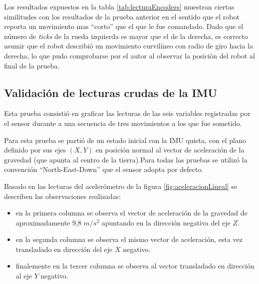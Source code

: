 Los resultados expuestos en la tabla \ref{tab:lecturaEncoders} muestran ciertas similitudes con los resultados de la prueba anterior en el sentido que el robot reporta un movimiento mas ``corto'' que el que le fue comandado. Dado que el número de \textit{ticks} de la rueda izquierda es mayor que el de la derecha, es correcto asumir que el robot describió un movimiento curvilíneo con radio de giro hacia la derecha, lo que pudo comprobarse por el autor al observar la posición del robot al final de la prueba.

\subsection{Validación de lecturas crudas de la IMU}

Esta prueba consistió en graficar las lecturas de las seis variables registradas por el sensor durante a una secuencia de tres movimientos a los que fue sometido.

Para esta prueba se partió de un estado inicial con la IMU quieta, con el plano definido por sus ejes $(X,Y)$ en posición normal al vector de aceleración de la gravedad (que apunta al centro de la tierra).Para todas las pruebas se utilizó la convención ``North-East-Down'' \protect\footnotemark que el sensor adopta por defecto.


Basado en las lecturas del acelerómetro de la figura \ref{fig:aceleracionLineal} se describen las observaciones realizadas:

\begin{itemize}
    \item en la primera columna se observa el vector de aceleración de la gravedad de aproximadamente 9,8 $m/s^2$ apuntando en la dirección negativa del eje $Z$.
    \item en la segunda columna se observa el mismo vector de aceleración, esta vez transladado en dirección del eje $X$ negativo.
    \item finalemente en la tercer columna se observa al vector transladado en dirección al eje $Y$ negativo.
\end{itemize}


